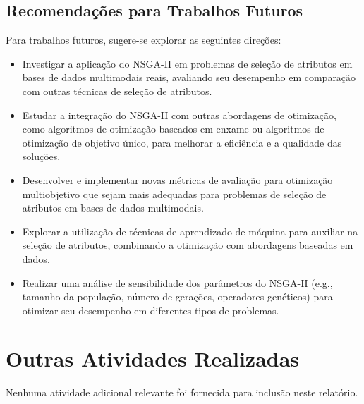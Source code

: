 \documentclass[12pt,openright,oneside,a4paper,english,brazil]{abntex2}
\begin{document}
\section{Recomendações para Trabalhos Futuros}
Para trabalhos futuros, sugere-se explorar as seguintes direções:
\begin{itemize}
    \item Investigar a aplicação do NSGA-II em problemas de seleção de atributos em bases de dados multimodais reais, avaliando seu desempenho em comparação com outras técnicas de seleção de atributos.
    \item Estudar a integração do NSGA-II com outras abordagens de otimização, como algoritmos de otimização baseados em enxame ou algoritmos de otimização de objetivo único, para melhorar a eficiência e a qualidade das soluções.
    \item Desenvolver e implementar novas métricas de avaliação para otimização multiobjetivo que sejam mais adequadas para problemas de seleção de atributos em bases de dados multimodais.
    \item Explorar a utilização de técnicas de aprendizado de máquina para auxiliar na seleção de atributos, combinando a otimização com abordagens baseadas em dados.
    \item Realizar uma análise de sensibilidade dos parâmetros do NSGA-II (e.g., tamanho da população, número de gerações, operadores genéticos) para otimizar seu desempenho em diferentes tipos de problemas.
\end{itemize}

\chapter{Outras Atividades Realizadas}
Nenhuma atividade adicional relevante foi fornecida para inclusão neste relatório.
\end{document}
